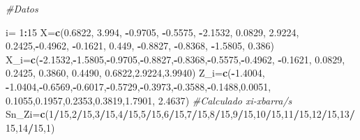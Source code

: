 \documentclass[
  a4paper,
  oneside,
  openany]{book}
\newenvironment{Shaded}{\begin{snugshade}}{\end{snugshade}}
\newcommand{\CommentTok}[1]{\textcolor[rgb]{0.56,0.35,0.01}{\textit{#1}}}
\newcommand{\DecValTok}[1]{\textcolor[rgb]{0.00,0.00,0.81}{#1}}
\newcommand{\FloatTok}[1]{\textcolor[rgb]{0.00,0.00,0.81}{#1}}
\newcommand{\FunctionTok}[1]{\textcolor[rgb]{0.13,0.29,0.53}{\textbf{#1}}}
\newcommand{\NormalTok}[1]{#1}
\newcommand{\OtherTok}[1]{\textcolor[rgb]{0.56,0.35,0.01}{#1}}
\newcommand{\SpecialCharTok}[1]{\textcolor[rgb]{0.81,0.36,0.00}{\textbf{#1}}}
\begin{document}
\begin{Shaded}
\begin{Highlighting}[]
\CommentTok{\#Datos}

\NormalTok{i}\OtherTok{=} \DecValTok{1}\SpecialCharTok{:}\DecValTok{15}
\NormalTok{X}\OtherTok{=}\FunctionTok{c}\NormalTok{(}\FloatTok{0.6822}\NormalTok{, }\FloatTok{3.994}\NormalTok{, }\SpecialCharTok{{-}}\FloatTok{0.9705}\NormalTok{, }\SpecialCharTok{{-}}\FloatTok{0.5575}\NormalTok{, }\SpecialCharTok{{-}}\FloatTok{2.1532}\NormalTok{, }\FloatTok{0.0829}\NormalTok{, }\FloatTok{2.9224}\NormalTok{,}
    \FloatTok{0.2425}\NormalTok{,}\SpecialCharTok{{-}}\FloatTok{0.4962}\NormalTok{, }\SpecialCharTok{{-}}\FloatTok{0.1621}\NormalTok{, }\FloatTok{0.449}\NormalTok{, }\SpecialCharTok{{-}}\FloatTok{0.8827}\NormalTok{, }\SpecialCharTok{{-}}\FloatTok{0.8368}\NormalTok{, }\SpecialCharTok{{-}}\FloatTok{1.5805}\NormalTok{, }\FloatTok{0.386}\NormalTok{)}
\NormalTok{X\_i}\OtherTok{=}\FunctionTok{c}\NormalTok{(}\SpecialCharTok{{-}}\FloatTok{2.1532}\NormalTok{,}\SpecialCharTok{{-}}\FloatTok{1.5805}\NormalTok{,}\SpecialCharTok{{-}}\FloatTok{0.9705}\NormalTok{,}\SpecialCharTok{{-}}\FloatTok{0.8827}\NormalTok{,}\SpecialCharTok{{-}}\FloatTok{0.8368}\NormalTok{,}\SpecialCharTok{{-}}\FloatTok{0.5575}\NormalTok{,}\SpecialCharTok{{-}}\FloatTok{0.4962}\NormalTok{, }\SpecialCharTok{{-}}\FloatTok{0.1621}\NormalTok{,  }\FloatTok{0.0829}\NormalTok{,  }\FloatTok{0.2425}\NormalTok{,}
      \FloatTok{0.3860}\NormalTok{, }\FloatTok{0.4490}\NormalTok{,  }\FloatTok{0.6822}\NormalTok{,}\FloatTok{2.9224}\NormalTok{,}\FloatTok{3.9940}\NormalTok{)}
\NormalTok{Z\_i}\OtherTok{=}\FunctionTok{c}\NormalTok{(}\SpecialCharTok{{-}}\FloatTok{1.4004}\NormalTok{, }\SpecialCharTok{{-}}\FloatTok{1.0404}\NormalTok{,}\SpecialCharTok{{-}}\FloatTok{0.6569}\NormalTok{,}\SpecialCharTok{{-}}\FloatTok{0.6017}\NormalTok{,}\SpecialCharTok{{-}}\FloatTok{0.5729}\NormalTok{,}\SpecialCharTok{{-}}\FloatTok{0.3973}\NormalTok{,}\SpecialCharTok{{-}}\FloatTok{0.3588}\NormalTok{,}\SpecialCharTok{{-}}\FloatTok{0.1488}\NormalTok{,}\FloatTok{0.0051}\NormalTok{,}
\FloatTok{0.1055}\NormalTok{,}\FloatTok{0.1957}\NormalTok{,}\FloatTok{0.2353}\NormalTok{,}\FloatTok{0.3819}\NormalTok{,}\FloatTok{1.7901}\NormalTok{,  }\FloatTok{2.4637}\NormalTok{) }\CommentTok{\#Calculado xi{-}xbarra/s}
\NormalTok{Sn\_Zi}\OtherTok{=}\FunctionTok{c}\NormalTok{(}\DecValTok{1}\SpecialCharTok{/}\DecValTok{15}\NormalTok{,}\DecValTok{2}\SpecialCharTok{/}\DecValTok{15}\NormalTok{,}\DecValTok{3}\SpecialCharTok{/}\DecValTok{15}\NormalTok{,}\DecValTok{4}\SpecialCharTok{/}\DecValTok{15}\NormalTok{,}\DecValTok{5}\SpecialCharTok{/}\DecValTok{15}\NormalTok{,}\DecValTok{6}\SpecialCharTok{/}\DecValTok{15}\NormalTok{,}\DecValTok{7}\SpecialCharTok{/}\DecValTok{15}\NormalTok{,}\DecValTok{8}\SpecialCharTok{/}\DecValTok{15}\NormalTok{,}\DecValTok{9}\SpecialCharTok{/}\DecValTok{15}\NormalTok{,}\DecValTok{10}\SpecialCharTok{/}\DecValTok{15}\NormalTok{,}\DecValTok{11}\SpecialCharTok{/}\DecValTok{15}\NormalTok{,}\DecValTok{12}\SpecialCharTok{/}\DecValTok{15}\NormalTok{,}\DecValTok{13}\SpecialCharTok{/}\DecValTok{15}\NormalTok{,}\DecValTok{14}\SpecialCharTok{/}\DecValTok{15}\NormalTok{,}\DecValTok{1}\NormalTok{)}

\end{Highlighting}
\end{Shaded}
\end{document}
